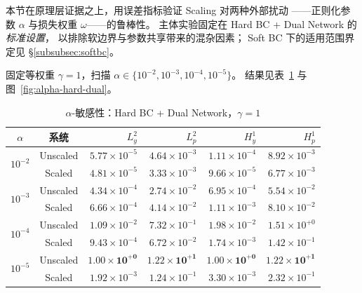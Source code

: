 \documentclass{xmu}
\theoremstyle{plain}
\theoremstyle{remark}
\begin{document}

\label{subsec:phenomenon}

本节在原理层证据之上，用误差指标验证 Scaling 对两种外部扰动
——正则化参数 $\alpha$ 与损失权重 $\omega$——的鲁棒性。
主体实验固定在 Hard BC + Dual Network 的\emph{标准设置}，
以排除软边界与参数共享带来的混杂因素；
Soft BC 下的适用范围界定见 §\ref{subsubsec:softbc}。

\label{subsubsec:alpha-sweep}

固定等权重 $\gamma = 1$，扫描
$\alpha\in\{10^{-2},10^{-3},10^{-4},10^{-5}\}$。
结果见表~\ref{tab:alpha-hard-dual} 与图~\ref{fig:alpha-hard-dual}。

\begin{table}[H]
  \centering
  \caption{$\alpha$-敏感性：Hard BC + Dual Network，$\gamma = 1$}
  \label{tab:alpha-hard-dual}
  \small
  \begin{tabular}{cc rrrr}
  \toprule
  $\alpha$ & 系统 & $L^2_y$ & $L^2_p$ & $H^1_y$ & $H^1_p$ \\
  \midrule
  \multirow{2}{*}{$10^{-2}$}
  & Unscaled & $5.77\times10^{-5}$ & $4.64\times10^{-3}$ & $1.11\times10^{-4}$ & $8.92\times10^{-3}$ \\
  & Scaled   & $4.81\times10^{-5}$ & $3.33\times10^{-3}$ & $9.66\times10^{-5}$ & $6.77\times10^{-3}$ \\
  \midrule
  \multirow{2}{*}{$10^{-3}$}
  & Unscaled & $4.34\times10^{-4}$ & $2.74\times10^{-2}$ & $6.95\times10^{-4}$ & $5.54\times10^{-2}$ \\
  & Scaled   & $6.66\times10^{-4}$ & $4.14\times10^{-2}$ & $1.11\times10^{-3}$ & $8.10\times10^{-2}$ \\
  \midrule
  \multirow{2}{*}{$10^{-4}$}
  & Unscaled & $1.09\times10^{-2}$ & $7.32\times10^{-1}$ & $1.98\times10^{-2}$ & $1.51\times10^{+0}$ \\
  & Scaled   & $9.43\times10^{-4}$ & $6.72\times10^{-2}$ & $1.74\times10^{-3}$ & $1.42\times10^{-1}$ \\
  \midrule
  \multirow{2}{*}{$10^{-5}$}
  & Unscaled & $\mathbf{1.00\times10^{+0}}$ & $\mathbf{1.22\times10^{+1}}$
             & $\mathbf{1.00\times10^{+0}}$ & $\mathbf{1.22\times10^{+1}}$ \\
  & Scaled   & $1.92\times10^{-3}$ & $1.24\times10^{-1}$ & $3.30\times10^{-3}$ & $2.32\times10^{-1}$ \\
  \bottomrule
  \end{tabular}
\end{table}
\end{document}
